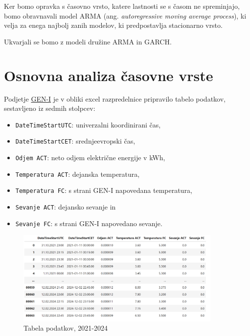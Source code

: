 \documentclass[a4paper, 11pt]{article}
\begin{document}
\noindent Ker bomo opravka s časovno vrsto, katere lastnosti se s časom ne spreminjajo, bomo
obravnavali model ARMA (ang. \emph{autoregressive moving average process}), ki velja za enega najbolj zanih modelov, ki predpostavlja stacionarno vrsto. 



\noindent Ukvarjali se bomo z modeli družine ARMA in GARCH. 




\pagebreak

\section{Osnovna analiza časovne vrste}

\noindent Podjetje \href{https://gen-i.si/}{GEN-I} je v obliki excel razpredelnice pripravilo tabelo podatkov, sestavljeno iz sedmih stolpcev:
\begin{itemize}
    \item  \texttt{DateTimeStartUTC}: univerzalni koordinirani čas,
    \item  \texttt{DateTimeStartCET}: srednjeevropski čas,
    \item  \texttt{Odjem ACT}: neto odjem električne energije v kWh,
    \item  \texttt{Temperatura ACT}: dejanska temperatura, 
    \item  \texttt{Temperatura FC}: s strani GEN-I napovedana temperatura,
    \item  \texttt{Sevanje ACT}: dejansko sevanje in
    \item  \texttt{Sevanje FC}: s strani GEN-I napovedano sevanje. 
\end{itemize}

\begin{figure}[h!]
    \centering
    \caption{Tabela podatkov, 2021-2024}\par\medskip
    \includegraphics[width=0.9\textwidth]{tabela.png}
\end{figure}
\end{document}

